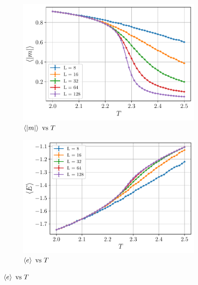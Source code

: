 \documentclass[../journal_main.tex]{subfiles}
\begin{document}
\begin{figure}[!htb]
    \centering
    \begin{subfigure}[b]{0.49\textwidth}  %
        \centering
        \includegraphics[width=\textwidth]{images/monte_carlo/wolff_cluster/abs(mag).pdf}
        \caption{$\expval{\abs{m}} \text{ vs } T$}
        \label{magnetization}
    \end{subfigure}
    \begin{subfigure}[b]{0.49\textwidth}
        \centering
        \includegraphics[width=\textwidth]{images/monte_carlo/wolff_cluster/edens.pdf}
        \caption{$\expval{e} \text{ vs } T$}
    \end{subfigure}
\end{figure}
\end{document}
